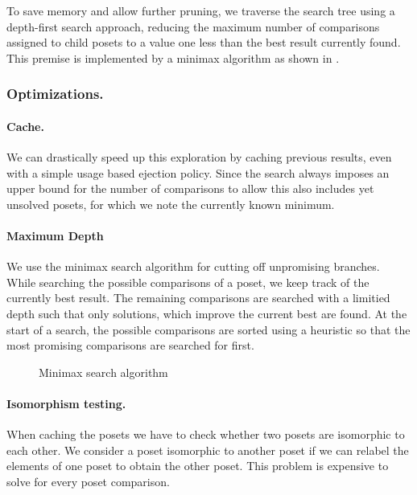 \documentclass[twoside,leqno,twocolumn]{article}
\begin{document}
To save memory and allow further pruning, we traverse the search tree using a depth-first search approach, reducing the maximum number of comparisons assigned to child posets to a value one less than the best result currently found.
This premise is implemented by a minimax algorithm as shown in .



\subsubsection{Optimizations.}

\paragraph{Cache.}
We can drastically speed up this exploration by caching previous results, even with a simple usage based ejection policy.
Since the search always imposes an upper bound for the number of comparisons to allow this also includes yet unsolved posets, for which we note the currently known minimum.

\paragraph{Maximum Depth}
We use the minimax search algorithm for cutting off unpromising branches.
While searching the possible comparisons of a poset, we keep track of the currently best result.
The remaining comparisons are searched with a limitied depth such that only solutions, which improve the current best are found.
At the start of a search, the possible comparisons are sorted using a heuristic so that the most promising comparisons are searched for first.

\begin{figure}[!b]
  \centering
  
  \caption{Minimax search algorithm}
  \label{fig:minimax_search}
\end{figure}

\paragraph{Isomorphism testing.}
When caching the posets we have to check whether two posets are isomorphic to each other.
We consider a poset isomorphic to another poset if we can relabel the elements of one poset to obtain the other poset.
This problem is expensive to solve for every poset comparison.
\end{document}
